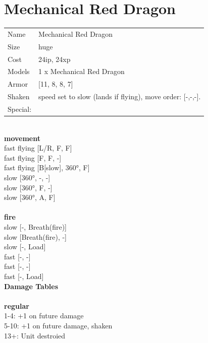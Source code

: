 \clearpage

\section{ Mechanical Red Dragon }

\begin{tabular}{ll}
  Name & Mechanical Red Dragon \\
  Size & huge\\
  Cost & 24ip, 24xp\\
  Models & 1 x Mechanical Red Dragon\\
  Armor & [11, 8, 8, 7]\\
  Shaken & speed set to slow (lands if flying), move order: [-,-,-].\\
  Special: \\
\end{tabular}

\noindent 

\ \\ {\bf movement } \\
fast flying [L/R, F, F] \\
fast flying [F, F, -] \\
fast flying [B[slow], 360°, F] \\
slow [360°, -, -] \\
slow [360°, F, -] \\
slow [360°, A, F] \\
\ \\ {\bf fire } \\
slow [-, Breath(fire)] \\
slow [Breath(fire), -] \\
slow [-, Load] \\
fast [-, -] \\
fast [-, -] \\
fast [-, Load] \\


{\bf Damage Tables} \\
\ \\ {\bf regular } \\
1-4: +1 on future damage \\
5-10: +1 on future damage, shaken \\
13+: Unit destroied \\


